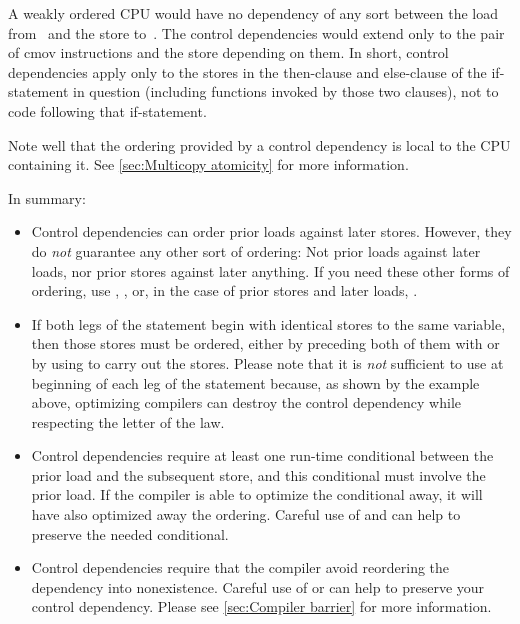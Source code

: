 A weakly ordered CPU would have no dependency of any sort between the load
from~ and the store to~.
The control dependencies would extend only to the pair of cmov
instructions and the store depending on them.
In short, control dependencies apply only to the stores in the then-clause
and else-clause of the if-statement in question (including functions
invoked by those two clauses), not to code following that if-statement.


Note well that the ordering provided by a control dependency is local
to the CPU containing it.
See \cref{sec:Multicopy atomicity} for more information.


In summary:

\begin{itemize}
 \item
      Control dependencies can order prior loads against later stores.
      However, they do \emph{not} guarantee any other sort of ordering:
      Not prior loads against later loads, nor prior stores against
      later anything.
      If you need these other forms of ordering, use ,
      , or, in the case of prior stores and later loads,
      .

 \item
      If both legs of the  statement begin with identical stores to
      the same variable, then those stores must be ordered, either by
      preceding both of them with  or by using
       to carry out the stores.
      Please note that it is \emph{not} sufficient to use 
      at beginning of each leg of the  statement because, as shown by
      the example above, optimizing compilers can destroy the control
      dependency while respecting the letter of the  law.

 \item
      Control dependencies require at least one run-time conditional
      between the prior load and the subsequent store, and this
      conditional must involve the prior load.
      If the compiler is able to optimize the conditional away, it will
      have also optimized away the ordering.
      Careful use of  and  can help to
      preserve the needed conditional.

 \item
      Control dependencies require that the compiler avoid reordering the
      dependency into nonexistence.
      Careful use of  or  can help
      to preserve your control dependency.
      Please see \cref{sec:Compiler barrier} for more information.


\end{itemize}

